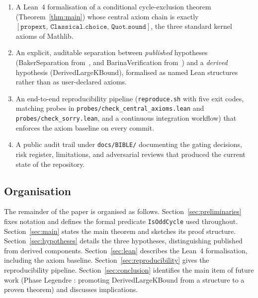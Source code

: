 \begin{enumerate}
  \item A Lean~4 formalisation of a conditional cycle-exclusion theorem
        (Theorem~\ref{thm:main}) whose central axiom chain is exactly
        \([\texttt{propext},\, \texttt{Classical.choice},\,
        \texttt{Quot.sound}]\), the three standard kernel axioms of
        Mathlib.
  \item An explicit, auditable separation between \emph{published}
        hypotheses (\textsf{BakerSeparation} from~\cite{Baker1966}, and
        \textsf{BarinaVerification} from~\cite{Barina2025}) and a
        \emph{derived} hypothesis (\textsf{DerivedLargeKBound}),
        formalised as named Lean structures rather than as
        user-declared axioms.
  \item An end-to-end reproducibility pipeline (\texttt{reproduce.sh}
        with five exit codes, matching probes in
        \texttt{probes/check\_central\_axioms.lean} and
        \texttt{probes/check\_sorry.lean}, and a continuous integration
        workflow) that enforces the axiom baseline on every commit.
  \item A public audit trail under \texttt{docs/BIBLE/} documenting the
        gating decisions, risk register, limitations, and adversarial
        reviews that produced the current state of the repository.
\end{enumerate}

\subsection{Organisation}

The remainder of the paper is organised as follows.
Section~\ref{sec:preliminaries} fixes notation and defines the formal
predicate \texttt{IsOddCycle} used throughout.
Section~\ref{sec:main} states the main theorem
and sketches its proof structure. Section~\ref{sec:hypotheses} details
the three hypotheses, distinguishing published from derived components.
Section~\ref{sec:lean} describes the Lean~4 formalisation, including the
axiom baseline. Section~\ref{sec:reproducibility} gives the
reproducibility pipeline. Section~\ref{sec:conclusion} identifies the
main item of future work (Phase Legendre : promoting
\textsf{DerivedLargeKBound} from a structure to a proven theorem) and
discusses implications.

